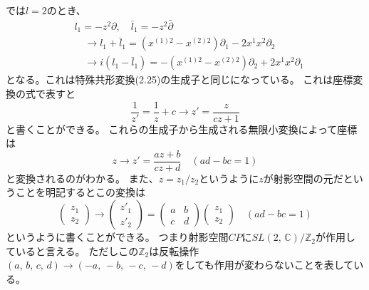 \documentclass[../../master.tex]{subfiles}
\begin{document}
では\(l=2\)のとき、
\begin{align*}
    &l_{1} = -z^2\partial,\quad \bar{l}_{1} = -z^2\bar{\partial}\\
    &\quad \rightarrow l_1 + \bar{l}_1 = (x^{(1)2}-x^{(2)2})\partial_1 - 2x^1x^2\partial_2\\
    &\quad \rightarrow i(l_1-\bar{l}_1) = -(x^{(1)2}-x^{(2)2})\partial_2 + 2x^1x^2\partial_1
\end{align*}
となる。これは特殊共形変換(2.25)の生成子と同じになっている。%
これは座標変換の式で表すと
\begin{equation*}
    \frac{1}{z'} = \frac{1}{z} + c \rightarrow z' = \frac{z}{cz+1}
\end{equation*}
と書くことができる。
これらの生成子から生成される無限小変換によって座標は
\begin{equation}
    z \rightarrow z' = \frac{az+b}{cz +d}\quad (ad-bc=1)
\end{equation}
と変換されるのがわかる。
また、\(z=z_1/z_2\)というように\(z\)が射影空間の元だということを明記するとこの変換は
\begin{equation}
    \begin{pmatrix}
        z_1\\ z_2
    \end{pmatrix}
    \rightarrow
    \begin{pmatrix}
        z'_1 \\z'_2
    \end{pmatrix}
    = \begin{pmatrix}
        a & b\\
        c & d
    \end{pmatrix}
    \begin{pmatrix}
        z_1 \\ z_2
    \end{pmatrix}
    \quad (ad-bc=1)
\end{equation}
というように書くことができる。
つまり射影空間\(CP\)に\(SL(2,\,\mathbb{C})/\mathbb{Z}_2\)が作用していると言える。
ただしこの\(\mathbb{Z}_2\)は反転操作\((a,\,b,\,c,\,d)\rightarrow(-a,\,-b,\,-c,\,-d)\)をしても作用が変わらないことを表している。
\end{document}

